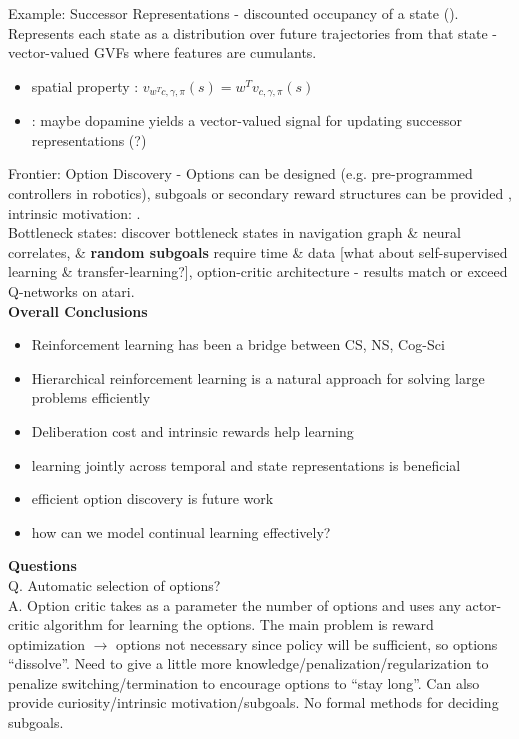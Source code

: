 \documentclass[12pt]{article}
\begin{document}
Example: Successor Representations - discounted occupancy of a state (\cite{Dayan93, Barreto16}). Represents each state as a distribution over future trajectories from that state - vector-valued GVFs where features are cumulants. 
\begin{itemize}
\item spatial property \cite{Barreto16}: $v_{w^Tc,\gamma,\pi}(s) = w^Tv_{c,\gamma,\pi}(s)$
\item \cite{Gershman 2018}: maybe dopamine yields a vector-valued signal for updating successor representations (?)
\end{itemize}

Frontier: Option Discovery - Options can be designed (e.g. pre-programmed controllers in robotics), subgoals or secondary reward structures can be provided \cite{Sutton98}, intrinsic motivation: \cite{Barto et al 2014}. \\

Bottleneck states: \cite{Solway2014} discover bottleneck states in navigation graph \& neural correlates, \& \textbf{random subgoals} require time \& data \cite{mann15} [what about self-supervised learning \& transfer-learning?], option-critic architecture \cite{BaconHP16} - results match or exceed Q-networks on atari. \\

\textbf{Overall Conclusions}
\begin{itemize}
    \item Reinforcement learning has been a bridge between CS, NS, Cog-Sci
    \item Hierarchical reinforcement learning is a natural approach for solving large problems efficiently
    \item Deliberation cost and intrinsic rewards help learning
    \item learning jointly across temporal and state representations is beneficial \cite{Franklin2018}
    \item efficient option discovery is future work
    \item how can we model continual learning effectively?
\end{itemize}

\textbf{Questions} \\

Q. Automatic selection of options? \\

A. Option critic takes as a parameter the number of options and uses any actor-critic algorithm for learning the options. The main problem is reward optimization $\rightarrow$ options not necessary since policy will be sufficient, so options ``dissolve''. Need to give a little more knowledge/penalization/regularization to penalize switching/termination to encourage options to ``stay long''. Can also provide curiosity/intrinsic motivation/subgoals. No formal methods for deciding subgoals. \\
\end{document}
